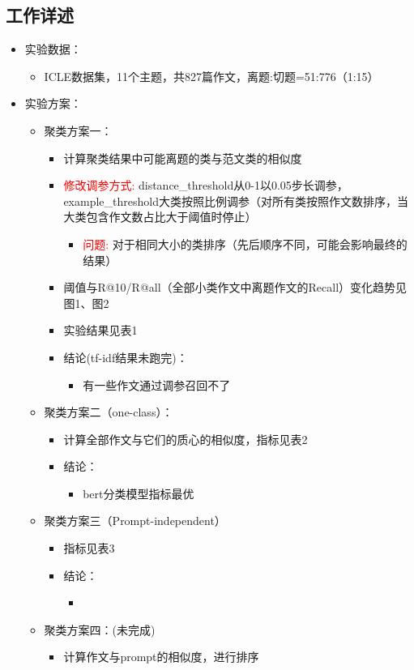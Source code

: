 \documentclass[11pt]{article}
\begin{document}
\begin{CJK}{UTF8}{gkai}
\section{工作详述}
\begin{itemize}
  \item 实验数据：
  \begin{itemize}
    \item ICLE数据集，11个主题，共827篇作文，离题:切题=51:776（1:15）
  \end{itemize}
  \item 实验方案：
  \begin{itemize}
    \item 聚类方案一：
    \begin{itemize}
      \item 计算聚类结果中可能离题的类与范文类的相似度
      \item \textcolor{red}{修改调参方式:} distance\_threshold从0-1以0.05步长调参，example\_threshold大类按照比例调参（对所有类按照作文数排序，当大类包含作文数占比大于阈值时停止）
      \begin{itemize}
        \item \textcolor{red}{问题:} 对于相同大小的类排序（先后顺序不同，可能会影响最终的结果）
      \end{itemize}
      \item 阈值与R@10/R@all（全部小类作文中离题作文的Recall）变化趋势见图1、图2
      \item 实验结果见表1
      \item 结论(tf-idf结果未跑完)：
      \begin{itemize}
        \item 有一些作文通过调参召回不了
      \end{itemize}
    \end{itemize}
    \item 聚类方案二（one-class）：
    \begin{itemize}
      \item 计算全部作文与它们的质心的相似度，指标见表2
      \item 结论：
      \begin{itemize}
        \item bert分类模型指标最优
      \end{itemize}
    \end{itemize}
    \item 聚类方案三（Prompt-independent）
    \begin{itemize}
      \item 指标见表3
      \item 结论：
      \begin{itemize}
        \item 
      \end{itemize}
    \end{itemize}
    \item 聚类方案四：(未完成)
    \begin{itemize}
      \item 计算作文与prompt的相似度，进行排序
    \end{itemize}
    

\end{itemize}
\end{itemize}
\end{CJK}
\end{document}
